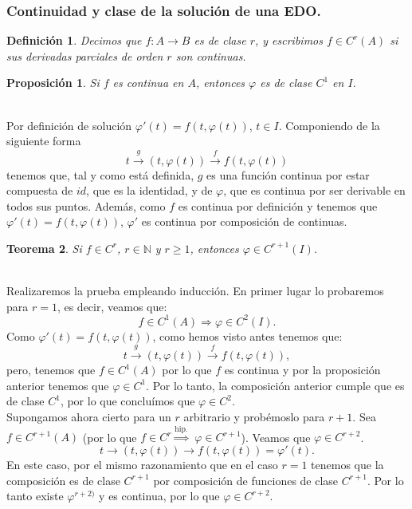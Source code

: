 \documentclass[11pt, a4paper,twoside]{article}
\makeatletter
\theoremstyle{theorem-style}  %
\newtheorem{theorem}{Teorema}[section]  %
\newtheorem{proposition}[theorem]{Proposición}
\renewenvironment{proof}[1][\proofname]{\par
	\pushQED{\qed}%
	\normalfont \topsep6\p@\@plus6\p@\relax
	\list{}{%
		\settowidth{\leftmargin}{\quad:\hskip\labelsep}%
		\setlength{\labelwidth}{0pt}%
		\setlength{\itemindent}{-\leftmargin}%
	}%
	\item[\hskip\labelsep\itshape#1\@addpunct{:}]\ignorespaces
}{%
	\popQED\endlist\@endpefalse
}
\theoremstyle{definition-style}
\newtheorem{definition}{Definición}[section]
\theoremstyle{example-style}
\makeatother
\begin{document}
\subsubsection{Continuidad y clase de la solución de una EDO.}
\begin{definition}
	Decimos que $ f:A\longrightarrow B $ es de clase $ r $, y escribimos $ f\in C^r(A) $ si sus derivadas parciales de orden $ r $ son continuas.
\end{definition}
\begin{proposition}
	Si $f$ es continua en $A$, entonces $\varphi$ es de clase $C^1$ en $I$.
\end{proposition}
\begin{proof} \ \\
	Por definición de solución $\varphi' (t) = f(t, \varphi (t))$, $t \in I$. Componiendo de la siguiente forma
	\[t \stackrel{g}{\longrightarrow} (t, \varphi (t)) \stackrel{f}{\longrightarrow} f(t, \varphi (t))\]
	tenemos que, tal y como está definida, $g$ es una función continua por estar compuesta de $id$, que es la identidad, y de $\varphi$, que es continua por ser derivable en todos sus puntos. Además, como $f$ es continua por definición y tenemos que $\varphi' (t) = f(t, \varphi (t))$, $\varphi'$ es continua por composición de continuas.
\end{proof}
\begin{theorem}
	Si $f \in C^r$, $r \in \mathbb{N}$ y $r \geq 1$, entonces $\varphi \in C^{r+1}(I)$.
\end{theorem}
\begin{proof}\ \\
	Realizaremos la prueba empleando inducción. En primer lugar lo probaremos para $r=1$, es decir, veamos que:
	\[f\in C^1(A) \Rightarrow \varphi \in C^2(I).\]
	Como $\varphi' (t) = f(t, \varphi (t))$, como hemos visto antes tenemos que:
		\[t \stackrel{g}{\longrightarrow} (t, \varphi (t)) \stackrel{f}{\longrightarrow} f(t, \varphi (t)),\]
	pero, tenemos que $f \in C^1(A)$ por lo que $f$ es continua y por la proposición anterior tenemos que $\varphi \in C^1$. Por lo tanto, la composición anterior cumple que es de clase $C^1$, por lo que concluímos que $\varphi \in C^2$. \\
	Supongamos ahora cierto para un $r$ arbitrario y probémoslo para $r+1$. Sea $f \in C^{r+1} (A)$ (por lo que $f \in C^r \stackrel{\text{hip.}}{\Rightarrow}$ $\varphi \in C^{r+1}$). Veamos que $\varphi \in C^{r+2}$.
	\[t \longrightarrow (t, \varphi (t)) \longrightarrow f(t, \varphi (t)) = \varphi' (t).\]
	En este caso, por el mismo razonamiento que en el caso $r=1$ tenemos que la composición es de clase $C^{r+1}$ por composición de funciones de clase $C^{r+1}$. Por lo tanto existe $\varphi^{r+2)}$ y es continua, por lo que $\varphi \in C^{r+2}$. 
\end{proof}
\end{document}
